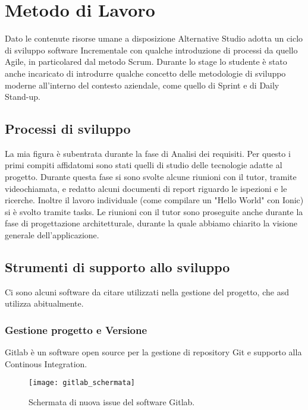 \section{Metodo di Lavoro}
Dato le contenute risorse umane a disposizione Alternative Studio adotta un ciclo di sviluppo software \gls{Incrementale} con qualche
introduzione di processi da quello \gls{Agile}, in particolared dal metodo \gls{Scrum}. Durante lo stage lo studente è stato anche
incaricato di introdurre qualche concetto delle metodologie di sviluppo moderne all'interno del contesto aziendale, come quello di
\gls{Sprint} e di \gls{Daily Stand-up}.

\subsection{Processi di sviluppo}
La mia figura è subentrata durante la fase di Analisi dei requisiti. Per questo i primi compiti affidatomi sono stati quelli di studio delle
tecnologie adatte al progetto. Durante questa fase si sono svolte alcune riunioni con il tutor, tramite videochiamata,
e redatto alcuni documenti di report riguardo le ispezioni e le ricerche. Inoltre il lavoro individuale (come compilare un "Hello World" con Ionic) si è svolto
tramite tasks. Le riunioni con il tutor sono proseguite anche durante la fase di progettazione architetturale, durante la quale abbiamo
chiarito la visione generale dell'applicazione.

\subsection{Strumenti di supporto allo sviluppo}
Ci sono alcuni software da citare utilizzati nella gestione del progetto, che \acrlong{asd} utilizza abitualmente.

\subsubsection{Gestione progetto e Versione}
Gitlab è un software open source per la gestione di repository \gls{Git} e supporto alla Continous Integration.

\begin{figure}[htbp]
	\begin{center}
		\texttt{[image: gitlab\_schermata]}
	\end{center}
	\caption {Schermata di nuova issue del software Gitlab.}
\end{figure}


